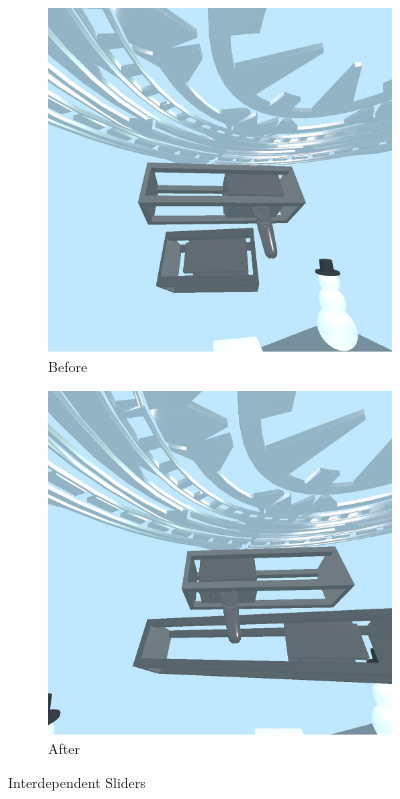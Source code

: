 \documentclass[conference,12pt]{IEEEtran}
\begin{document}
\begin{figure}[H]
    \begin{subfigure}{\linewidth}
        \centering
        \includegraphics[width=0.8\linewidth]{screenshots/slider_a.jpg}
        \caption{Before}
    \end{subfigure}
    \begin{subfigure}{\linewidth}
        \centering
        \includegraphics[width=0.8\linewidth]{screenshots/slider_b.jpg}
        \caption{After}
    \end{subfigure}
    \caption{Interdependent Sliders}
    \label{fig:sliders}
\end{figure}
\end{document}
